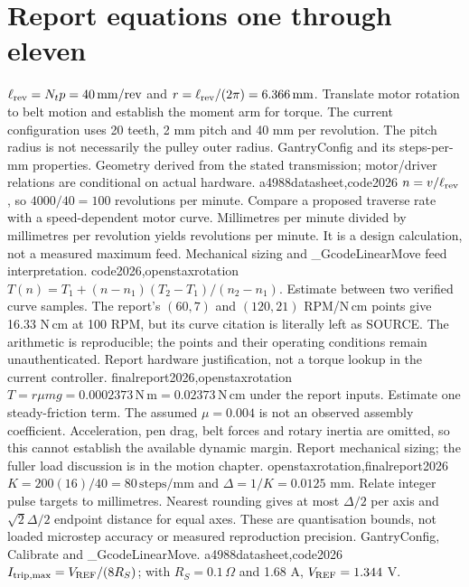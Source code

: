 \section{Report equations one through eleven}
{$\ell_{\rm rev}=N_tp=40\,\mathrm{mm/rev}$ and
$r=\ell_{\rm rev}/(2\pi)=6.366\,\mathrm{mm}$.}
{Translate motor rotation to belt motion and establish the moment arm for torque.
The current configuration uses 20 teeth, 2 mm pitch and 40 mm per revolution.
The pitch radius is not necessarily the pulley outer radius.}
{GantryConfig and its steps-per-mm properties. Geometry derived from the stated
transmission; motor/driver relations are conditional on actual hardware.}
{a4988datasheet,code2026}
{$n=v/\ell_{\rm rev}$, so $4000/40=100$ revolutions per minute.}
{Compare a proposed traverse rate with a speed-dependent motor curve. Millimetres
per minute divided by millimetres per revolution yields revolutions per minute.
It is a design calculation, not a measured maximum feed.}
{Mechanical sizing and \_GcodeLinearMove feed interpretation.}
{code2026,openstaxrotation}
{$T(n)=T_1+(n-n_1)(T_2-T_1)/(n_2-n_1)$.}
{Estimate between two verified curve samples. The report's $(60,7)$ and
$(120,21)$ RPM/N\,cm points give 16.33 N\,cm at 100 RPM, but its curve citation
is literally left as SOURCE. The arithmetic is reproducible; the points and
their operating conditions remain unauthenticated.}
{Report hardware justification, not a torque lookup in the current controller.}
{finalreport2026,openstaxrotation}
{$T=r\mu mg=0.0002373\,\mathrm{N\,m}=0.02373\,\mathrm{N\,cm}$ under the report inputs.}
{Estimate one steady-friction term. The assumed $\mu=0.004$ is not an observed
assembly coefficient. Acceleration, pen drag, belt forces and rotary inertia
are omitted, so this cannot establish the available dynamic margin.}
{Report mechanical sizing; the fuller load discussion is in the motion chapter.}
{openstaxrotation,finalreport2026}
{$K=200(16)/40=80\,\mathrm{steps/mm}$ and $\Delta=1/K=0.0125$ mm.}
{Relate integer pulse targets to millimetres. Nearest rounding gives at most
$\Delta/2$ per axis and $\sqrt2\Delta/2$ endpoint distance for equal axes.
These are quantisation bounds, not loaded microstep accuracy or measured
reproduction precision.}
{GantryConfig, Calibrate and \_GcodeLinearMove.}
{a4988datasheet,code2026}
{$I_{\rm trip,max}=V_{\rm REF}/(8R_S)$; with $R_S=0.1\,\Omega$ and 1.68 A,
$V_{\rm REF}=1.344$ V.}
